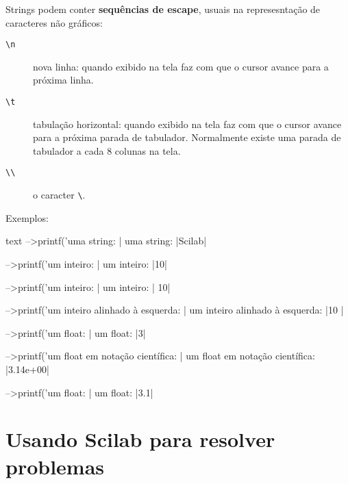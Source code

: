 \documentclass[11pt,fleqn]{practice}
\begin{document}
Strings podem conter \textbf{sequências de escape}, usuais na
represesntação de caracteres não gráficos:
\begin{description}
  \item [\texttt{\textbackslash n}] nova linha: quando exibido na tela
  faz com que o cursor avance para a próxima linha.
  \item [\texttt{\textbackslash t}] tabulação horizontal: quando exibido
  na tela faz com que o cursor avance para a próxima parada de
  tabulador. Normalmente existe uma parada de tabulador a cada 8 colunas
  na tela.
  \item [\texttt{\textbackslash \textbackslash}] o caracter
  \texttt{\textbackslash}.
\end{description}

Exemplos:
\begin{lst}{text}
-->printf('uma string: |%
uma string: |Scilab|
 
-->printf('um inteiro: |%
um inteiro: |10|
 
-->printf('um inteiro: |%
um inteiro: |  10|
 
-->printf('um inteiro alinhado à esquerda: |%
um inteiro alinhado à esquerda: |10  |
 
-->printf('um float: |%
um float: |3|
 
-->printf('um float em notação científica: |%
um float em notação científica: |3.14e+00|
 
-->printf('um float: |%
um float: |3.1|
\end{lst}

\section{Usando Scilab para resolver problemas}
\end{document}
